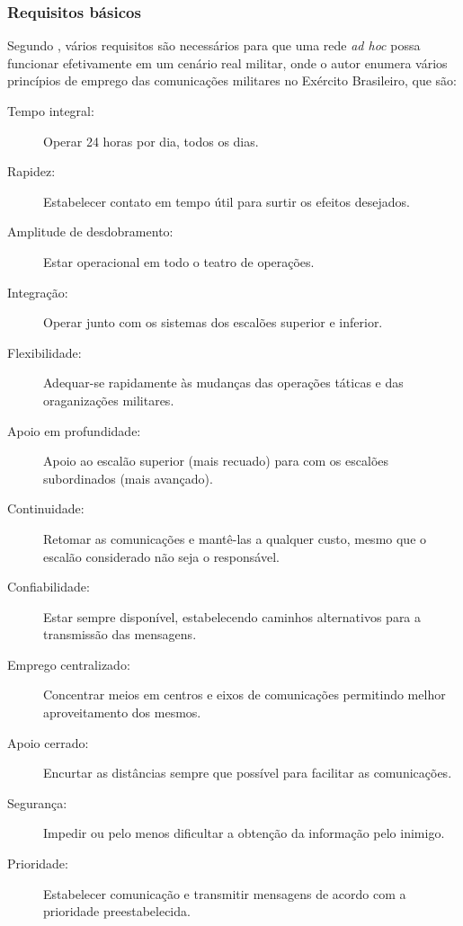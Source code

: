 \subsubsection{Requisitos b\'asicos}
Segundo \cite{salles}, v\'arios requisitos s\~ao necess\'arios para que uma rede \textit{ad hoc} possa funcionar efetivamente em um cen\'ario real militar, onde o autor enumera v\'arios princ\'ipios de emprego das comunica\c{c}\~oes militares no Ex\'ercito Brasileiro, que s\~ao:
\begin{description}
	\item[Tempo integral:] Operar 24 horas por dia, todos os dias.
	\item[Rapidez:] Estabelecer contato em tempo \'util para surtir os efeitos desejados.
	\item[Amplitude de desdobramento:] Estar operacional em todo o teatro de opera\c{c}\~oes.
	\item[Integra\c{c}\~ao:] Operar junto com os sistemas dos escal\~oes superior e inferior.
	\item[Flexibilidade:] Adequar-se rapidamente \`as mudan\c{c}as das opera\c{c}\~oes t\'aticas e das oraganiza\c{c}\~oes militares.
	\item[Apoio em profundidade:] Apoio ao escal\~ao superior (mais recuado) para com os escal\~oes subordinados (mais avan\c{c}ado).
	\item[Continuidade:] Retomar as comunica\c{c}\~oes e mant\^e-las a qualquer custo, mesmo que o escal\~ao considerado n\~ao seja o respons\'avel.
	\item[Confiabilidade:] Estar sempre dispon\'ivel, estabelecendo caminhos alternativos para a transmiss\~ao das mensagens.
	\item[Emprego centralizado:] Concentrar meios em centros e eixos de comunica\c{c}\~oes permitindo melhor aproveitamento dos mesmos.
	\item[Apoio cerrado:] Encurtar as dist\^ancias sempre que poss\'ivel para facilitar as comunica\c{c}\~oes.
	\item[Seguran\c{c}a:] Impedir ou pelo menos dificultar a obten\c{c}\~ao da informa\c{c}\~ao pelo inimigo.
	\item[Prioridade:] Estabelecer comunica\c{c}\~ao e transmitir mensagens de acordo com a prioridade preestabelecida.
\end{description}

